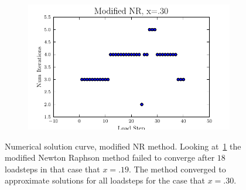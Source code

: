\documentclass[10pt,letterpaper]{article}
\begin{document}
\begin{figure}[!tbh]
\begin{subfigure}[b]{.6\textwidth}
    \caption{}
    \label{fig3:label:c}
  \end{subfigure}
  \hfill
  \begin{subfigure}[b]{.6\textwidth}
    \includegraphics[width=\textwidth]{moded_nr_x30_conv.pdf}
    \caption{}
    \label{fig3:label:d}
  \end{subfigure}
  \caption{Numerical solution curve, modified NR method. Looking at~\ref{fig3:label:c} the modified Newton Raphson method failed to converge after $18$ loadsteps in that case that $x=.19$. The method converged to approximate solutions for all loadsteps for the case that $x=.30$.
 }
\end{figure}
\end{document}
